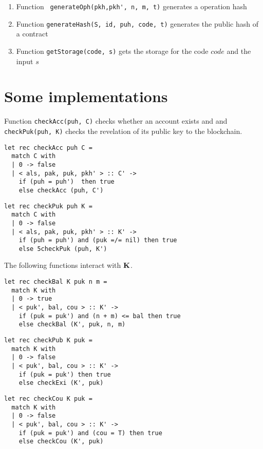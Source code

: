 \documentclass[a4paper]{llncs}
\begin{document}
\begin{enumerate}
    \item Function \verb! generateOph(pkh,pkh', n, m, t)! generates a operation hash

    \item Function \verb!generateHash(S, id, puh, code, t)! generates the public hash of a contract 
     
    \item Function \verb!getStorage(code, s)! gets the storage for the code $code$ and the input $s$
\end{enumerate}



\section{Some implementations}
Function \verb!checkAcc(puh, C)! checks whether an account exists and and \verb!checkPuk(puh, K)! checks the revelation of its public key to the blockchain.
\begin{verbatim}
let rec checkAcc puh C =
  match C with
  | 0 -> false
  | < als, pak, puk, pkh' > :: C' ->
    if (puh = puh')  then true 
    else checkAcc (puh, C')
\end{verbatim}

\begin{verbatim}
let rec checkPuk puh K =
  match C with
  | 0 -> false
  | < als, pak, puk, pkh' > :: K' ->
    if (puh = puh') and (puk =/= nil) then true 
    else 5checkPuk (puh, K')
\end{verbatim}

The following functions interact with $\textbf{K}$. 

\begin{verbatim}
let rec checkBal K puk n m =
  match K with
  | 0 -> true
  | < puk', bal, cou > :: K' ->
    if (puk = puk') and (n + m) <= bal then true 
    else checkBal (K', puk, n, m)
\end{verbatim}

\begin{verbatim}
let rec checkPub K puk =
  match K with
  | 0 -> false
  | < puk', bal, cou > :: K' ->
    if (puk = puk') then true 
    else checkExi (K', puk)
\end{verbatim}

\begin{verbatim}
let rec checkCou K puk =
  match K with
  | 0 -> false
  | < puk', bal, cou > :: K' ->
    if (puk = puk') and (cou = T) then true 
    else checkCou (K', puk)
\end{verbatim}
\end{document}
